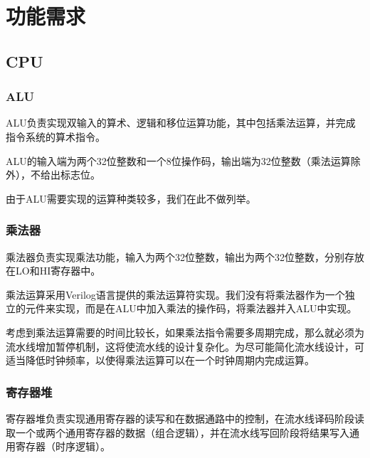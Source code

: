 \section{功能需求}
\subsection{CPU}
\subsubsection{ALU}
ALU负责实现双输入的算术、逻辑和移位运算功能，其中包括乘法运算，并完成指令系统的算术指令。

ALU的输入端为两个32位整数和一个8位操作码，输出端为32位整数（乘法运算除外），不给出标志位。

由于ALU需要实现的运算种类较多，我们在此不做列举。


\subsubsection{乘法器}
乘法器负责实现乘法功能，输入为两个32位整数，输出为两个32位整数，分别存放在LO和HI寄存器中。

乘法运算采用Verilog语言提供的乘法运算符实现。我们没有将乘法器作为一个独立的元件来实现，而是在ALU中加入乘法的操作码，将乘法器并入ALU中实现。

考虑到乘法运算需要的时间比较长，如果乘法指令需要多周期完成，那么就必须为流水线增加暂停机制，这将使流水线的设计复杂化。为尽可能简化流水线设计，可适当降低时钟频率，以使得乘法运算可以在一个时钟周期内完成运算。

\subsubsection{寄存器堆}
寄存器堆负责实现通用寄存器的读写和在数据通路中的控制，在流水线译码阶段读取一个或两个通用寄存器的数据（组合逻辑），并在流水线写回阶段将结果写入通用寄存器（时序逻辑）。

